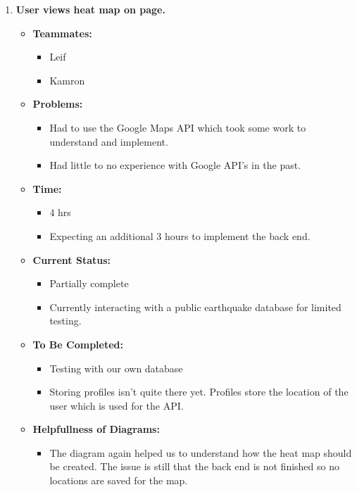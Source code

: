 \documentclass[12pt]{article}
\begin{document}
\begin{enumerate}
    \item \textbf{User views heat map on page.}
      \begin{itemize}
        \item \textbf{Teammates:}
          \begin{itemize}
            \item Leif
            \item Kamron
          \end{itemize}
        \item \textbf{Problems:}
          \begin{itemize}
            \item Had to use the Google Maps API which took some work to understand and implement.
            \item Had little to no experience with Google API’s in the past.
          \end{itemize}
        \item \textbf{Time:}
          \begin{itemize}
            \item 4 hrs
            \item Expecting an additional 3 hours to implement the back end.
          \end{itemize}
        \item \textbf{Current Status:}
          \begin{itemize}
            \item Partially complete
            \item Currently interacting with a public earthquake database for limited testing.
          \end{itemize}
        \item \textbf{To Be Completed:}
          \begin{itemize}
            \item Testing with our own database
            \item Storing profiles isn’t quite there yet. Profiles store the location of the user which is used for the API.
          \end{itemize}
        \item \textbf{Helpfullness of Diagrams:}
          \begin{itemize}
            \item The diagram again helped us to understand how the heat map should be created. The issue is still that the back end is not finished so no locations are saved for the map.
          \end{itemize}
      \end{itemize}


\end{enumerate}
\end{document}
